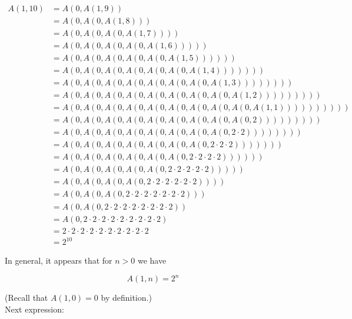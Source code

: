 \documentclass{report}
\begin{document}
\begin{align*}
  A(1, 10) &= A(0, A(1, 9)) \\
           &= A(0, A(0, A(1, 8))) \\
           &= A(0, A(0, A(0, A(1, 7)))) \\
           &= A(0, A(0, A(0, A(0, A(1, 6))))) \\
           &= A(0, A(0, A(0, A(0, A(0, A(1, 5)))))) \\
           &= A(0, A(0, A(0, A(0, A(0, A(0, A(1, 4))))))) \\
           &= A(0, A(0, A(0, A(0, A(0, A(0, A(0, A(1, 3)))))))) \\
           &= A(0, A(0, A(0, A(0, A(0, A(0, A(0, A(0, A(1, 2))))))))) \\
           &= A(0, A(0, A(0, A(0, A(0, A(0, A(0, A(0, A(0, A(1, 1)))))))))) \\
           &= A(0, A(0, A(0, A(0, A(0, A(0, A(0, A(0, A(0, 2))))))))) \\
           &= A(0, A(0, A(0, A(0, A(0, A(0, A(0, A(0, 2\cdot2)))))))) \\
           &= A(0, A(0, A(0, A(0, A(0, A(0, A(0, 2\cdot2\cdot2))))))) \\
           &= A(0, A(0, A(0, A(0, A(0, A(0, 2\cdot2\cdot2\cdot2)))))) \\
           &= A(0, A(0, A(0, A(0, A(0, 2\cdot2\cdot2\cdot2\cdot2))))) \\
           &= A(0, A(0, A(0, A(0, 2\cdot2\cdot2\cdot2\cdot2\cdot2)))) \\
           &= A(0, A(0, A(0, 2\cdot2\cdot2\cdot2\cdot2\cdot2\cdot2))) \\
           &= A(0, A(0, 2\cdot2\cdot2\cdot2\cdot2\cdot2\cdot2\cdot2)) \\
           &= A(0, 2\cdot2\cdot2\cdot2\cdot2\cdot2\cdot2\cdot2\cdot2) \\
           &= 2\cdot2\cdot2\cdot2\cdot2\cdot2\cdot2\cdot2\cdot2\cdot2 \\
           &= 2^{10}
\end{align*}

In general, it appears that for $n > 0$ we have

\begin{equation}
  A(1, n) = 2^n
\end{equation}

(Recall that $A(1, 0) = 0$ by definition.) \\

Next expression:
\end{document}
